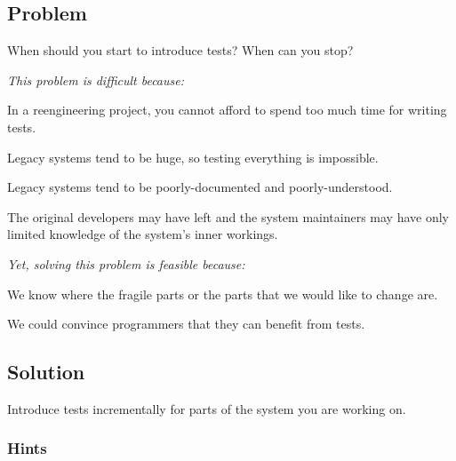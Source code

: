 \documentclass[a4paper,10pt,twoside]{book}
\begin{document}



\subsection*{Problem}

When should you start to introduce tests? When can you stop?

\emph{This problem is difficult because:}

\begin{bulletlist}
\item In a reengineering project, you cannot afford to spend too much time for writing tests.
\item Legacy systems tend to be huge, so testing everything is impossible.
\item Legacy systems tend to be poorly-documented and poorly-understood.
\item The original developers may have left and the system maintainers may have only limited knowledge of the system's inner workings.
\end{bulletlist}

\emph{Yet, solving this problem is feasible because:}

\begin{bulletlist}
\item We know where the fragile parts or the parts that we would like to change are.
\item We could convince programmers that they can benefit from tests.
\end{bulletlist}

\subsection*{Solution}

Introduce tests incrementally for parts of the system you are working on.

\subsubsection*{Hints}
\end{document}

